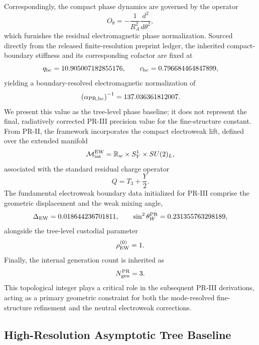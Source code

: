 \documentclass[11pt]{article}
\begin{document}
Correspondingly, the compact phase dynamics are governed by the operator
\begin{equation}
O_\theta=-\frac{1}{R_A^2}\frac{d^2}{d\theta^2},
\end{equation}
which furnishes the residual electromagnetic phase normalization. Sourced directly from the released finite-resolution preprint ledger, the inherited compact-boundary stiffness and its corresponding cofactor are fixed at
\begin{equation}
q_{\rm bc}=10.905007182855176,
\qquad
c_{\rm bc}=0.796684464847899,
\end{equation}
yielding a boundary-resolved electromagnetic normalization of
\begin{equation}
\left(\alpha_{\rm PR,bc}\right)^{-1}=137.036361812007 .
\end{equation}
We present this value as the tree-level phase baseline; it does not represent the final, radiatively corrected PR-III precision value for the fine-structure constant. From PR-II, the framework incorporates the compact electroweak lift, defined over the extended manifold
\begin{equation}
\mathcal M_{\rm int}^{\rm EW}=\mathbb R_w\times S_Y^1\times SU(2)_L,
\end{equation}
associated with the standard residual charge operator
\begin{equation}
Q=T_3+\frac{Y}{2}.
\end{equation}
The fundamental electroweak boundary data initialized for PR-III comprise the geometric displacement and the weak mixing angle,
\begin{equation}
\Delta_{\rm EW}=0.018644236701811,
\qquad
\sin^2\theta_W^{\rm PR}=0.231355763298189,
\end{equation}
alongside the tree-level custodial parameter
\begin{equation}
\rho_{\rm EW}^{(0)}=1 .
\end{equation}
Finally, the internal generation count is inherited as
\begin{equation}
N_{\rm gen}^{\rm PR}=3.
\end{equation}
This topological integer plays a critical role in the subsequent PR-III derivations, acting as a primary geometric constraint for both the mode-resolved fine-structure refinement and the neutral electroweak corrections.

\subsection{High-Resolution Asymptotic Tree Baseline}
\label{subsec:priii-high-resolution-alpha-baseline}
\end{document}

